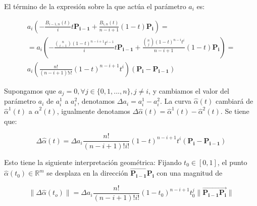 \documentclass{article}
\newcommand{\R}{\mathbb{R}}
\begin{document}
El término de la expresión sobre la que actúa el parámetro $a_i$ es:

\begin{gather*}
a_i \left( -\frac{B_{i-1,n}(t)}{i} t \mathbf{P_{i-1}} + \frac{B_{i,n}(t)}{n-i+1} (1-t) \mathbf{P_i} \right) = \\
= a_i \left( -\frac{\binom{n}{i-1}(1-t)^{n-i+1} t^{i-1}}{i} t \mathbf{P_{i-1}} + \frac{\binom{n}{j}(1-t)^{n-i}t^i}{n-i+1} (1-t) \mathbf{P_i} \right) = \\
a_i \left( \frac{n!}{(n-i+1)!i!} (1-t)^{n-i+1} t^i  \right) \left( \mathbf{P_i} - \mathbf{P_{i-1}} \right)
\end{gather*}

Supongamos que $a_j = 0, \forall j\in\{0,1,...,n\}, j \neq i $, y cambiamos el valor del parámetro $a_i$ de $a_i^1$ a $a_i^2$, denotamos $\Delta a_i = a_i^1 - a_i^2$. La curva $\hat{\alpha}(t)$ cambiará de $\hat{\alpha}^1(t)$ a $\hat{\alpha}^2(t)$, igualmente denotamos $\Delta \hat{\alpha}(t) = \hat{\alpha}^1(t) - \hat{\alpha}^2(t)$. Se tiene que:

\begin{equation*}
\Delta \hat{\alpha}(t) = \Delta a_i \frac{n!}{(n-i+1)!i!}(1-t)^{n-i+1}t^i \left( \mathbf{P_i} - \mathbf{P_{i-1}} \right)
\end{equation*}

Esto tiene la siguiente interpretación geométrica: Fijando $t_0 \in [0,1]$, el punto $\hat{\alpha}(t_0) \in \R^m$ se desplaza en la dirección $\overrightarrow{\mathbf{P_{i-1}P_i}}$ con una magnitud de

\begin{equation*}
\lVert \Delta\hat{\alpha}(t_o) \rVert =  \Delta a_i \frac{n!}{(n-i+1)!i!}(1-t_0)^{n-i+1}t_0^j \lVert \overrightarrow{\mathbf{P_{i-1}P_i}} \rVert
\end{equation*}
\end{document}
